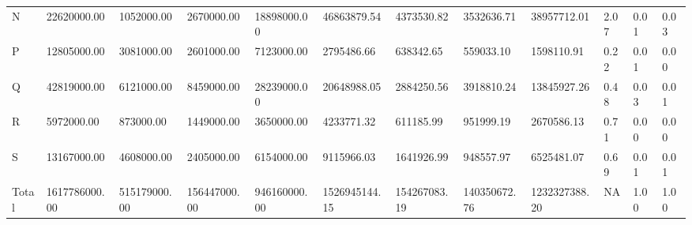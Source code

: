 \begin{table}
{\begin{tabular}[t]{llllllllllll}
N & 22620000.00 & 1052000.00 & 2670000.00 & 18898000.00 & 46863879.54 & 4373530.82 & 3532636.71 & 38957712.01 & 2.07 & 0.01 & 0.03\\
P & 12805000.00 & 3081000.00 & 2601000.00 & 7123000.00 & 2795486.66 & 638342.65 & 559033.10 & 1598110.91 & 0.22 & 0.01 & 0.00\\
Q & 42819000.00 & 6121000.00 & 8459000.00 & 28239000.00 & 20648988.05 & 2884250.56 & 3918810.24 & 13845927.26 & 0.48 & 0.03 & 0.01\\
\addlinespace
R & 5972000.00 & 873000.00 & 1449000.00 & 3650000.00 & 4233771.32 & 611185.99 & 951999.19 & 2670586.13 & 0.71 & 0.00 & 0.00\\
S & 13167000.00 & 4608000.00 & 2405000.00 & 6154000.00 & 9115966.03 & 1641926.99 & 948557.97 & 6525481.07 & 0.69 & 0.01 & 0.01\\
Total & 1617786000.00 & 515179000.00 & 156447000.00 & 946160000.00 & 1526945144.15 & 154267083.19 & 140350672.76 & 1232327388.20 & NA & 1.00 & 1.00\\
\bottomrule
\end{tabular}}
\end{table}
